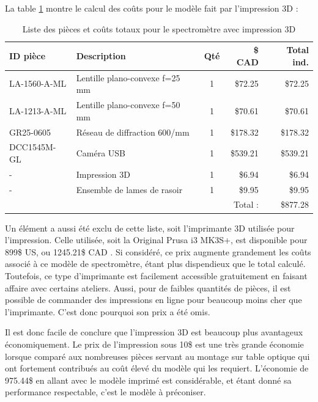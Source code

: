 \documentclass[11pt,letterpaper]{article}
\begin{document}

La table \ref{prix_3D} montre le calcul des coûts pour le modèle fait par l'impression 3D :

\begin{table}[!ht]
    \centering
    \caption{Liste des pièces et coûts totaux pour le spectromètre avec impression 3D \cite{noauthor_thorlabs_2024} \cite{noauthor_razor_2024}}
    \begin{tabular}{|l|l|c|r|r|}
    \hline
        ID pièce & Description & Qté & \$ CAD & Total ind. \\ \hline\hline
        LA-1560-A-ML & Lentille plano-convexe f=25 mm & 1 & \$72.25 & \$72.25 \\ \hline
        LA-1213-A-ML & Lentille plano-convexe f=50 mm & 1 & \$70.61 & \$70.61 \\ \hline
        GR25-0605 & Réseau de diffraction 600/mm & 1 & \$178.32 & \$178.32 \\ \hline
        DCC1545M-GL & Caméra USB & 1 & \$539.21 & \$539.21 \\ \hline
        - & Impression 3D & 1 & \$6.94 & \$6.94 \\ \hline
        - & Ensemble de lames de rasoir & 1 & \$9.95 & \$9.95 \\ \hline\hline
        ~ & ~ & ~ & Total : & \$877.28 \\ \hline
    \end{tabular}
    \label{prix_3D}
\end{table}

Un élément a aussi été exclu de cette liste, soit l'imprimante 3D utilisée pour l'impression.
Celle utilisée, soit la Original Prusa i3 MK3S+, est disponible pour 899\$ US, ou 1245.21\$ CAD \cite{prusa_imprimante_2024} .
Si considéré, ce prix augmente grandement les coûts associé à ce modèle de spectromètre, étant
plus dispendieux que le total calculé. Toutefois, ce type d'imprimante est facilement accessible
gratuitement en faisant affaire avec certains ateliers. Aussi, pour de faibles quantités de
pièces, il est possible de commander des impressions en ligne pour beaucoup moins cher que
l'imprimante. C'est donc pourquoi son prix a été omis.

Il est donc facile de conclure que l'impression 3D est beaucoup plus avantageux économiquement.
Le prix de l'impression sous 10\$ est une très grande économie lorsque comparé aux nombreuses
pièces servant au montage sur table optique qui ont fortement contribués au coût élevé du
modèle qui les requiert. L'économie de 975.44\$ en allant avec le modèle imprimé est
considérable, et étant donné sa performance respectable, c'est le modèle à préconiser.





\end{document}
